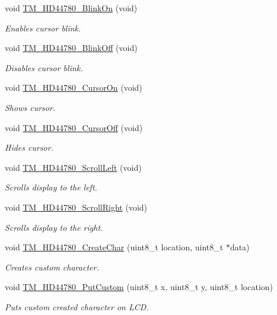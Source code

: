 \begin{DoxyCompactItemize}
void \hyperlink{group___t_m___h_d44780___functions_ga90b3c2e024edc54e3a00b074a5e12b35}{T\+M\+\_\+\+H\+D44780\+\_\+\+Blink\+On} (void)
\begin{DoxyCompactList}\small\item\em Enables cursor blink. \end{DoxyCompactList}\item 
void \hyperlink{group___t_m___h_d44780___functions_ga4e4bd5908824745d2d7b00f20616bdb0}{T\+M\+\_\+\+H\+D44780\+\_\+\+Blink\+Off} (void)
\begin{DoxyCompactList}\small\item\em Disables cursor blink. \end{DoxyCompactList}\item 
void \hyperlink{group___t_m___h_d44780___functions_gaee93c2b0c5485e82b5bdb299851da4c3}{T\+M\+\_\+\+H\+D44780\+\_\+\+Cursor\+On} (void)
\begin{DoxyCompactList}\small\item\em Shows cursor. \end{DoxyCompactList}\item 
void \hyperlink{group___t_m___h_d44780___functions_gab469e6dacbf2526bbdac70114edd11ba}{T\+M\+\_\+\+H\+D44780\+\_\+\+Cursor\+Off} (void)
\begin{DoxyCompactList}\small\item\em Hides cursor. \end{DoxyCompactList}\item 
void \hyperlink{group___t_m___h_d44780___functions_gabd360dcaabda6114a4d63ab3d63fde48}{T\+M\+\_\+\+H\+D44780\+\_\+\+Scroll\+Left} (void)
\begin{DoxyCompactList}\small\item\em Scrolls display to the left. \end{DoxyCompactList}\item 
void \hyperlink{group___t_m___h_d44780___functions_ga9ac0912d00ab55d31f36bfef953dd0bf}{T\+M\+\_\+\+H\+D44780\+\_\+\+Scroll\+Right} (void)
\begin{DoxyCompactList}\small\item\em Scrolls display to the right. \end{DoxyCompactList}\item 
void \hyperlink{group___t_m___h_d44780___functions_ga32d98afae3fae1d278778dec7aac9130}{T\+M\+\_\+\+H\+D44780\+\_\+\+Create\+Char} (uint8\+\_\+t location, uint8\+\_\+t $\ast$data)
\begin{DoxyCompactList}\small\item\em Creates custom character. \end{DoxyCompactList}\item 
void \hyperlink{group___t_m___h_d44780___functions_ga7bebbde61659ffbd254d5153ddf44ea4}{T\+M\+\_\+\+H\+D44780\+\_\+\+Put\+Custom} (uint8\+\_\+t x, uint8\+\_\+t y, uint8\+\_\+t location)
\begin{DoxyCompactList}\small\item\em Puts custom created character on L\+CD. \end{DoxyCompactList}\end{DoxyCompactItemize}


